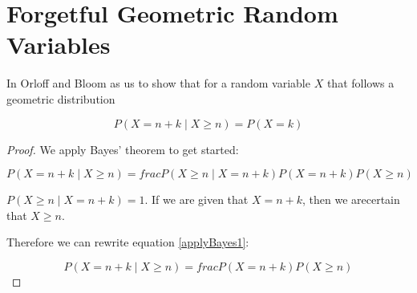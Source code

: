 \documentclass[a4paper,11pt]{article}
\begin{document}
\section{Forgetful Geometric Random Variables}

In \cite{slides4} Orloff and Bloom as us to show that for a random
variable $X$ that follows a geometric distribution

\begin{equation}
P \left( X = n + k \mid X \geq n \right) = P \left( X = k \right)
\end{equation}

\begin{proof}

We apply Bayes' theorem \cite{reading3} to get started:

\begin{equation}\label{applyBayes1}
P \left( X = n + k \mid X \geq n \right) = 
  frac
  { 
    P \left( X \geq n \mid X = n + k  \right) P \left( X = n + k \right)
  }
  {
    P \left( X \geq n \right)
  }
\end{equation}

$P \left( X \geq n \mid X = n + k  \right) = 1$.  If we are given that
$X = n + k$, then we arecertain that $X \geq n$.

Therefore we can rewrite equation \ref{applyBayes1}:

\begin{equation}\label{applyBayes1}
P \left( X = n + k \mid X \geq n \right) = 
  frac
  { 
    P \left( X = n + k \right)
  }
  {
    P \left( X \geq n \right)
  }
\end{equation}

\end{proof}
 
\printbibliography{}
\end{document}
